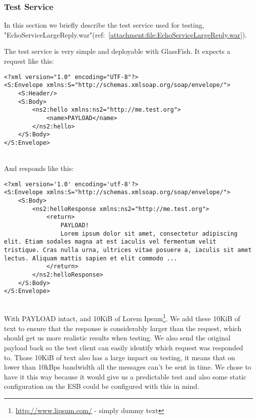 \subsubsection{Test Service}\label{Testing:About:Service}
    In this section we briefly describe the test service used for testing, "EchoServiceLargeReply.war"(ref:~\ref{attachment:file:EchoServiceLargeReply.war}).

    The test service is very simple and deployable with GlassFish. It expects a request like this:
    \lstset{language=XML, style=eclipse}
    \begin{lstlisting}
<?xml version="1.0" encoding="UTF-8"?>
<S:Envelope xmlns:S="http://schemas.xmlsoap.org/soap/envelope/">
    <S:Header/>
    <S:Body>
        <ns2:hello xmlns:ns2="http://me.test.org">
            <name>PAYLOAD</name>
        </ns2:hello>
    </S:Body>
</S:Envelope>
    \end{lstlisting}
    \\
    And responds like this:
    \begin{lstlisting}
<?xml version='1.0' encoding='utf-8'?>
<S:Envelope xmlns:S="http://schemas.xmlsoap.org/soap/envelope/">
    <S:Body>
        <ns2:helloResponse xmlns:ns2="http://me.test.org">
            <return>
                PAYLOAD!
                Lorem ipsum dolor sit amet, consectetur adipiscing elit. Etiam sodales magna at est iaculis vel fermentum velit tristique. Cras nulla urna, ultrices vitae posuere a, iaculis sit amet lectus. Aliquam mattis sapien et elit commodo ...
            </return>
        </ns2:helloResponse>
    </S:Body>
</S:Envelope>
    \end{lstlisting}
    \\
    With PAYLOAD intact, and 10KiB of Lorem Ipsum\footnote{\url{http://www.lipsum.com/} - simply dummy text}. We add these 10KiB of text to ensure that the response is considerably larger than the request, which should get us more realistic results when testing. We also send the original payload back so the test client can easily identify which request was responded to. Those 10KiB of text also has a large impact on testing, it means that on lower than 10kBps bandwidth all the messages can't be sent in time. We chose to have it this way because it would give us a predictable test and also some static configuration on the ESB could be configured with this in mind.


